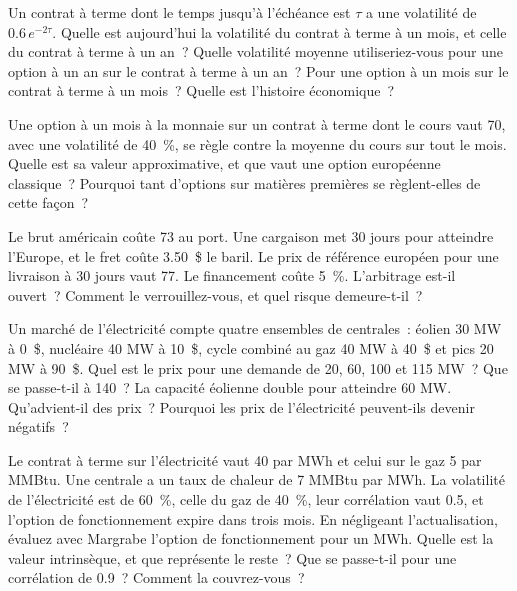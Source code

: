 \begin{question}\label{iq:iv2:commodities-and-energy:10}
Un contrat à terme dont le temps jusqu'à l'échéance est $\tau$ a une volatilité de $0.6\,e^{-2\tau}$. Quelle est aujourd'hui la volatilité du contrat à terme à un mois, et celle du contrat à terme à un an~? Quelle volatilité moyenne utiliseriez-vous pour une option à un an sur le contrat à terme à un an~? Pour une option à un mois sur le contrat à terme à un mois~? Quelle est l'histoire économique~?
\end{question}

\begin{question}\label{iq:iv2:commodities-and-energy:11}
Une option à un mois à la monnaie sur un contrat à terme dont le cours vaut 70, avec une volatilité de 40~\%, se règle contre la moyenne du cours sur tout le mois. Quelle est sa valeur approximative, et que vaut une option européenne classique~? Pourquoi tant d'options sur matières premières se règlent-elles de cette façon~?
\end{question}

\begin{question}\label{iq:iv2:commodities-and-energy:12}
Le brut américain coûte 73 au port. Une cargaison met 30 jours pour atteindre l'Europe, et le fret coûte 3.50~\$ le baril. Le prix de référence européen pour une livraison à 30 jours vaut 77. Le financement coûte 5~\%. L'arbitrage est-il ouvert~? Comment le verrouillez-vous, et quel risque demeure-t-il~?
\end{question}

\begin{question}\label{iq:iv2:commodities-and-energy:13}
Un marché de l'électricité compte quatre ensembles de centrales~: éolien 30 MW à 0~\$, nucléaire 40 MW à 10~\$, cycle combiné au gaz 40 MW à 40~\$ et pics 20 MW à 90~\$. Quel est le prix pour une demande de 20, 60, 100 et 115 MW~? Que se passe-t-il à 140~? La capacité éolienne double pour atteindre 60 MW. Qu'advient-il des prix~? Pourquoi les prix de l'électricité peuvent-ils devenir négatifs~?
\end{question}

\begin{question}\label{iq:iv2:commodities-and-energy:14}
Le contrat à terme sur l'électricité vaut 40 par MWh et celui sur le gaz 5 par MMBtu. Une centrale a un taux de chaleur de 7 MMBtu par MWh. La volatilité de l'électricité est de 60~\%, celle du gaz de 40~\%, leur corrélation vaut 0.5, et l'option de fonctionnement expire dans trois mois. En négligeant l'actualisation, évaluez avec Margrabe l'option de fonctionnement pour un MWh. Quelle est la valeur intrinsèque, et que représente le reste~? Que se passe-t-il pour une corrélation de 0.9~? Comment la couvrez-vous~?
\end{question}

